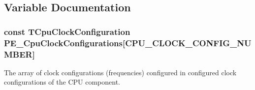\subsection{Variable Documentation}
\hypertarget{group___cpu__module_gab69281f0e90d16198a5595ed7f471441}{
\subsubsection[{P\-E\-\_\-\-Cpu\-Clock\-Configurations}]{\setlength{\rightskip}{0pt plus 5cm}const {\bf T\-Cpu\-Clock\-Configuration} P\-E\-\_\-\-Cpu\-Clock\-Configurations\mbox{[}C\-P\-U\-\_\-\-C\-L\-O\-C\-K\-\_\-\-C\-O\-N\-F\-I\-G\-\_\-\-N\-U\-M\-B\-E\-R\mbox{]}}}\label{group___cpu__module_gab69281f0e90d16198a5595ed7f471441}
The array of clock configurations (frequencies) configured in configured clock configurations of the C\-P\-U component. 